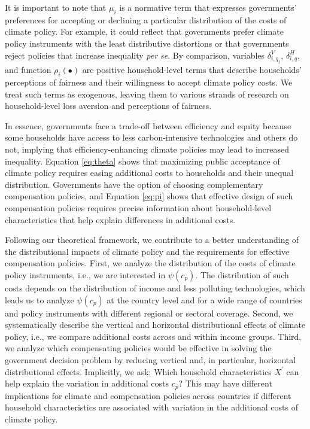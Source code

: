 \documentclass[12pt, a4paper]{article}
\begin{document}
It is important to note that $\mu_{i}$ is a normative term that expresses governments' preferences for accepting or declining a particular distribution of the costs of climate policy. For example, it could reflect that governments prefer climate policy instruments with the least distributive distortions \autocite{Fischer.2019} or that governments reject policies that increase inequality \textit{per se}. By comparison, variables $\delta_{i,q_{j}}^{V}$, $\delta_{i,q}^{H}$, and function $\rho_{i}(\bullet)$ are positive household-level terms that describe households' perceptions of fairness and their willingness to accept climate policy costs. We treat such terms as exogenous, leaving them to various strands of research on household-level loss aversion and perceptions of fairness. 

In essence, governments face a trade-off between efficiency and equity \autocite{Hansel.2022,TerryDinan.2016,Drupp.2024} because some households have access to less carbon-intensive technologies and others do not, implying that efficiency-enhancing climate policies may lead to increased inequality. Equation \ref{eq:theta} shows that maximizing public acceptance of climate policy requires easing additional costs to households and their unequal distribution. Governments have the option of choosing complementary compensation policies, and Equation \ref{eq:pi} shows that effective design of such compensation policies requires precise information about household-level characteristics that help explain differences in additional costs. 

Following our theoretical framework, we contribute to a better understanding of the distributional impacts of climate policy and the requirements for effective compensation policies. First, we analyze the distribution of the costs of climate policy instruments, i.e., we are interested in $\psi(c_{p})$. The distribution of such costs depends on the distribution of income and less polluting technologies, which leads us to analyze $\psi(c_{p})$ at the country level and for a wide range of countries and policy instruments with different regional or sectoral coverage. Second, we systematically describe the vertical and horizontal distributional effects of climate policy, i.e., we compare additional costs across and within income groups. Third, we analyze which compensating policies would be effective in solving the government decision problem by reducing vertical and, in particular, horizontal distributional effects. Implicitly, we ask: Which household characteristics $X^{\prime}$ can help explain the variation in additional costs $c_{p}$? This may have different implications for climate and compensation policies across countries if different household characteristics are associated with variation in the additional costs of climate policy.    
\end{document}
